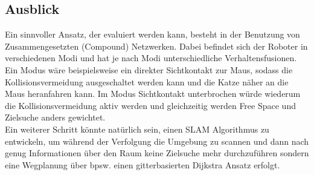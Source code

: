 \documentclass[12pt, a4paper]{report}
\begin{document}
\subsection*{Ausblick} \label{chap:ausblick}
Ein sinnvoller Ansatz, der evaluiert werden kann, besteht in der Benutzung von Zusammengesetzten (Compound) Netzwerken. Dabei befindet sich der Roboter in verschiedenen Modi und hat je nach Modi unterschiedliche Verhaltensfusionen. Ein Modus wäre beispielsweise ein direkter Sichtkontakt zur Maus, sodass die Kollisionsvermeidung ausgeschaltet werden kann und die Katze näher an die Maus heranfahren kann. Im Modus Sichtkontakt unterbrochen würde wiederum die Kollisionsvermeidung aktiv werden und gleichzeitig werden Free Space und Zielsuche anders gewichtet.
\\
Ein weiterer Schritt könnte natürlich sein, einen SLAM Algorithmus zu entwickeln, um während der Verfolgung die Umgebung zu scannen und dann nach genug Informationen über den Raum keine Zielsuche mehr durchzuführen sondern eine Wegplanung über bpsw. einen gitterbasierten Dijkstra Ansatz erfolgt.
\end{document}
